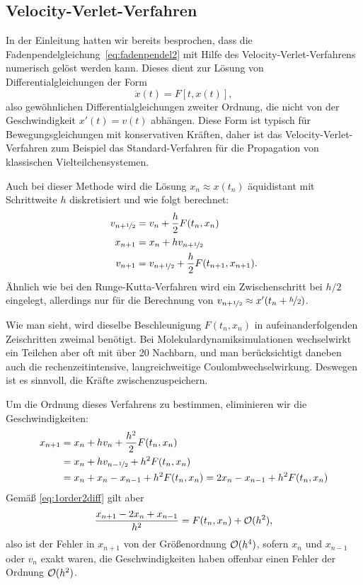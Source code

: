 \subsection{Velocity-Verlet-Verfahren}

In der Einleitung hatten wir bereits besprochen, dass die
Fadenpendelgleichung~\eqref{eq:fadenpendel2} mit Hilfe des
Velocity-Verlet-Verfahrens numerisch gelöst werden kann. Dieses dient
zur Lösung von Differentialgleichungen der Form
\begin{equation}
  \ddot x(t) = F[t, x(t)],
\end{equation}
also gewöhnlichen Differentialgleichungen zweiter Ordnung, die nicht
von der Geschwindigkeit $x'(t) = v(t)$ abhängen. Diese Form ist
typisch für Bewegungsgleichungen mit konservativen Kräften, daher ist
das Velocity-Verlet-Verfahren zum Beispiel das Standard-Verfahren für
die Propagation von klassischen Vielteilchensystemen.

Auch bei dieser Methode wird die Lösung $x_n\approx x(t_n)$
äquidistant mit Schrittweite $h$ diskretisiert und wie folgt
berechnet:
\begin{align}
  v_{n+\nicefrac{1}{2}} &= v_n + \frac{h}{2} F(t_n, x_n) \nonumber\\
  x_{n+1} &= x_n + h v_{n+\nicefrac{1}{2}} \\
  v_{n+1} &= v_{n+\nicefrac{1}{2}} + \frac{h}{2} F(t_{n+1}, x_{n+1}).\nonumber
\end{align}
Ähnlich wie bei den Runge-Kutta-Verfahren wird ein Zwischenschritt bei
$h/2$ eingelegt, allerdings nur für die Berechnung von
$v_{n+\nicefrac{1}{2}}\approx x'(t_n + \nicefrac{h}{2})$.

Wie man sieht, wird dieselbe Beschleunigung $F(t_n, x_n)$ in
aufeinanderfolgenden Zeischritten zweimal benötigt. Bei
Molekulardynamiksimulationen wechselwirkt ein Teilchen aber oft mit
über 20 Nachbarn, und man berücksichtigt daneben auch die
rechenzeitintensive, langreichweitige Coulombwechselwirkung. Deswegen
ist es sinnvoll, die Kräfte zwischenzuspeichern.

Um die Ordnung dieses Verfahrens zu bestimmen, eliminieren wir die
Geschwindigkeiten:
\begin{align}
  x_{n+1} &= x_n + h v_n + \frac{h^2}{2} F(t_n, x_n)\nonumber\\
  &=  x_n + h v_{n-\nicefrac{1}{2}} + h^2F(t_n, x_n)\nonumber\\
  &=  x_n + x_n - x_{n-1} + h^2F(t_n, x_n)
  =  2 x_n - x_{n-1} + h^2F(t_n, x_n)
\end{align}
Gemäß \eqref{eq:1order2diff} gilt aber
\begin{equation}
  \frac{x_{n+1}  - 2 x_n + x_{n-1}}{h^2} = F(t_n, x_n) + \mathcal O(h^2),
\end{equation}
also ist der Fehler in $x_{n+1}$ von der Größenordnung $\mathcal O(h^4)$,
sofern $x_n$ und $x_{n-1}$ oder $v_n$ exakt waren, die
Geschwindigkeiten haben offenbar einen Fehler der Ordnung $\mathcal O(h^2)$.

